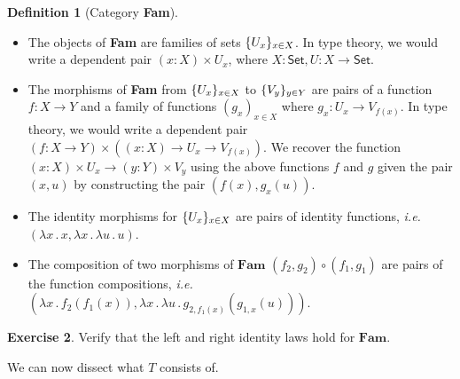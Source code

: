\documentclass{article}
\makeatletter
\newcommand{\ie}{\textit{i.e.}\@\xspace}
\renewcommand{\_}{\textrm{\textscale{.5}{\textunderscore}}}
\DeclarePairedDelimiter{\set}{\{}{\}}
\newcommand{\cat}[1]{\textbf{#1}}
\newcommand{\Fun}[3]{(#1 \mathbin{:} #2) \mathrel{\to} #3}
\newcommand{\fun}[2]{\lambda #1 \mathpunct{.} #2}
\newcommand{\Pair}[3]{(#1 \mathbin{:} #2) \mathrel{\times} #3}
\newcommand{\Set}{\mathsf{Set}}
\theoremstyle{definition}
\newtheorem{definition}{Definition}[section]
\newtheorem{exercise}[definition]{Exercise}
\theoremstyle{plain}
\makeatother
\begin{document}
\begin{definition}[Category \cat{Fam}]\label{def:fam} \leavevmode
\begin{itemize}
    \item The objects of \cat{Fam} are families of sets $\set{U_x}_{x \in X}$.
    In type theory, we would write a dependent pair $\Pair{x}{X}{U_x}$,
    where $X : \Set, U : X \to \Set$.
    \item The morphisms of \cat{Fam} from $\set{U_x}_{x \in X}$ to $\set{V_y}_{y \in Y}$
    are pairs of a function $f : X \to Y$ and a family of functions $(g_x)_{x \in X}$
    where $g_x : U_x \to V_{f(x)}$.
    In type theory, we would write a dependent pair
    $\Pair{f}{X \to Y}{(\Fun{x}{X}{U_x \to V_{f(x)}})}$.
    We recover the function $\Pair{x}{X}{U_x} \to \Pair{y}{Y}{V_y}$
    using the above functions $f$ and $g$ given the pair $(x, u)$
    by constructing the pair $(f(x), g_x(u))$.
    \item The identity morphisms for $\set{U_x}_{x \in X}$ are pairs of identity functions,
    \ie $(\fun{x}{x}, \fun{x}{\fun{u}{u}})$.
    \item The composition of two morphisms of $\cat{Fam}$ $(f_2, g_2) \circ (f_1, g_1)$
    are pairs of the function compositions, \ie $(\fun{x}{f_2(f_1(x))}, \fun{x}{\fun{u}{g_{2, f_1(x)}(g_{1, x}(u))}})$.
\end{itemize}
\end{definition}

\begin{exercise}
Verify that the left and right identity laws hold for $\cat{Fam}$.
\end{exercise}

We can now dissect what $T$ consists of.
\end{document}
